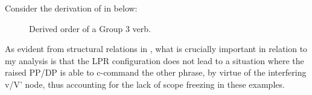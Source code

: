 \documentclass[output=paper,colorlinks,citecolor=brown,nonflat]{./langscibook}
\begin{document}
Consider the derivation of  in  below:

\begin{figure}
\caption{Derived order of a Group 3 verb.}
\label{fig:antonyuk:4}
\end{figure}


As evident from structural relations in , what is crucially important in relation to my analysis is that the LPR configuration does not lead to a situation where the raised PP/DP is able to c-command the other phrase, by virtue of the interfering v/V' node, thus accounting for the lack of scope freezing in these examples.
\end{document}
